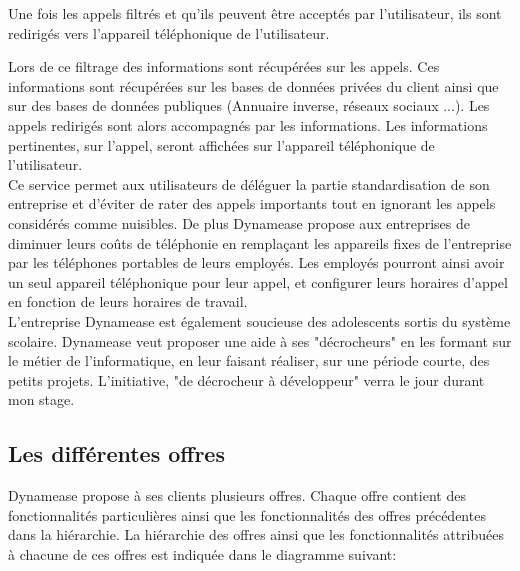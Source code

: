 Une fois les appels filtrés et qu'ils peuvent être acceptés par l'utilisateur, ils sont redirigés vers l'appareil téléphonique de l'utilisateur.

Lors de ce filtrage des informations sont récupérées sur les appels. Ces informations sont récupérées sur les bases de données privées du client ainsi que sur des bases de données publiques (Annuaire inverse, réseaux sociaux ...). Les appels redirigés sont alors accompagnés par les informations. Les informations pertinentes, sur l'appel, seront affichées sur l'appareil téléphonique de l'utilisateur.\\

Ce service permet aux utilisateurs de déléguer la partie standardisation de son entreprise et d'éviter de rater des appels importants tout en ignorant les appels considérés comme nuisibles. De plus Dynamease propose aux entreprises de diminuer leurs coûts de téléphonie en remplaçant les appareils fixes de l'entreprise par les téléphones portables de leurs employés. Les employés pourront ainsi avoir un seul appareil téléphonique pour leur appel, et configurer leurs horaires d'appel en fonction de leurs horaires de travail.\\

L'entreprise Dynamease est également soucieuse des adolescents sortis du système scolaire. Dynamease veut proposer une aide à ses "décrocheurs" en les formant sur le métier de l'informatique, en leur faisant réaliser, sur une période courte, des petits projets. L'initiative, "de décrocheur à développeur" verra le jour durant mon stage.

\subsection{Les différentes offres}

Dynamease propose à ses clients plusieurs offres. Chaque offre contient des fonctionnalités particulières ainsi que les fonctionnalités des offres précédentes dans la hiérarchie.  La hiérarchie des offres ainsi que les fonctionnalités attribuées à chacune de ces offres est indiquée dans le diagramme suivant:

